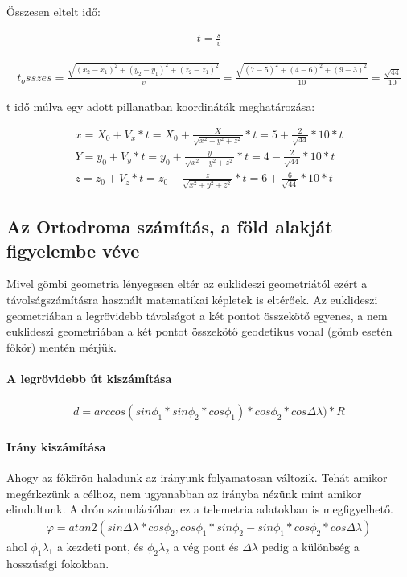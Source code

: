 Összesen eltelt idő:

\begin{gather}
    t = \frac{s}{v}
\end{gather}

\begin{gather}
    t_osszes = \frac{\sqrt{(x_2 - x_1)^2 + (y_2 - y_1)^2 + (z_2 - z_1)^2}}{v} = \frac{\sqrt{(7 - 5)^2 + (4 - 6)^2 + (9 - 3)^2}}{10} = \frac{\sqrt{44}}{10}{}
\end{gather}

t idő múlva egy adott pillanatban koordináták meghatározása:

\begin{gather}
    x = X_0 + V_x * t = X_0 + \frac{X}{\sqrt{x^2 + y^2 + z^2}} * t = 5 + \frac{2}{\sqrt{44}} * 10 * t \\
    Y = y_0 + V_y * t = y_0 + \frac{y}{\sqrt{x^2 + y^2 + z^2}} * t = 4 - \frac{2}{\sqrt{44}} * 10 * t \\
    z = z_0 + V_z * t = z_0 + \frac{z}{\sqrt{x^2 + y^2 + z^2}} * t = 6 + \frac{6}{\sqrt{44}} * 10 * t
\end{gather}

\subsection{Az Ortodroma számítás, a föld alakját figyelembe véve}

Mivel gömbi geometria lényegesen eltér az euklideszi geometriától ezért a távolságszámításra használt matematikai képletek is eltérőek.
Az euklideszi geometriában a legrövidebb távolságot a két pontot összekötő egyenes,
a nem euklideszi geometriában a két pontot összekötő geodetikus vonal (gömb esetén főkör) mentén mérjük.

\paragraph{A legrövidebb út kiszámítása}
\begin{gather}
    d = arccos(sin\phi_1 * sin\phi_2 * cos\phi_1)* cos\phi_2 * cos\Delta \lambda) * R
\end{gather}

\paragraph{Irány kiszámítása}
Ahogy az főkörön haladunk az irányunk folyamatosan változik. Tehát amikor megérkezünk a célhoz, nem ugyanabban az irányba nézünk mint amikor elindultunk.
A drón szimulációban ez a telemetria adatokban is megfigyelhető.
\begin{gather*}
    \varphi = atan2(sin\Delta\lambda * cos\phi_{2}, cos\phi_{1} * sin\phi_{2} - sin\phi_{1} * cos\phi_{2} * cos\Delta\lambda)
\end{gather*}
ahol $\phi_{1}\lambda_{1}$ a kezdeti pont, és $\phi_{2}\lambda_{2}$ a vég pont és $\Delta\lambda$ pedig a különbség a hosszúsági fokokban.

